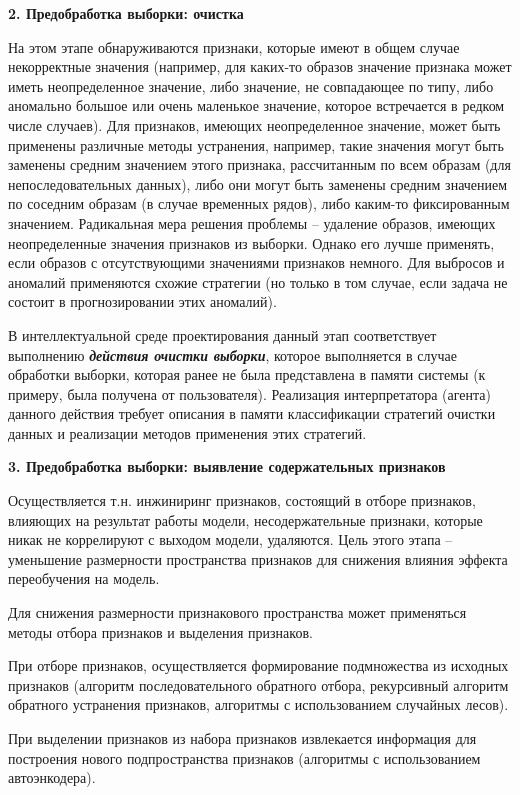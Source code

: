 \textbf{2. Предобработка выборки: очистка}

На этом этапе обнаруживаются признаки, которые имеют в общем случае некорректные значения (например, для каких-то образов значение признака может иметь неопределенное значение, либо значение, не совпадающее по типу, либо аномально большое или очень маленькое значение, которое встречается в редком числе случаев). Для признаков, имеющих неопределенное значение, может быть применены различные методы устранения, например, такие значения могут быть заменены средним значением этого признака, рассчитанным по всем образам (для непоследовательных данных), либо они могут быть заменены средним значением по соседним образам (в случае временных рядов), либо каким-то фиксированным значением. Радикальная мера решения проблемы -- удаление образов, имеющих неопределенные значения признаков из выборки. Однако его лучше применять, если образов с отсутствующими значениями признаков немного. Для выбросов и аномалий применяются схожие стратегии (но только в том случае, если задача не состоит в прогнозировании этих аномалий).

В интеллектуальной среде проектирования данный этап соответствует выполнению \textbf{\textit{действия очистки выборки}}, которое выполняется в случае обработки выборки, которая ранее не была представлена в памяти системы (к примеру, была получена от пользователя).
Реализация интерпретатора (агента) данного действия требует описания в памяти классификации стратегий очистки данных и реализации методов применения этих стратегий.


\textbf{3. Предобработка выборки: выявление содержательных признаков}

Осуществляется т.н. инжиниринг признаков, состоящий в отборе признаков, влияющих на результат работы модели, несодержательные признаки, которые никак не коррелируют с выходом модели, удаляются. Цель этого этапа -- уменьшение размерности пространства признаков для снижения влияния эффекта переобучения на модель.

Для снижения размерности признакового пространства может применяться методы отбора признаков и выделения признаков.

При отборе признаков, осуществляется формирование подмножества из исходных признаков (алгоритм последовательного обратного отбора, рекурсивный алгоритм обратного устранения признаков,  алгоритмы с использованием случайных лесов).

При выделении признаков из набора признаков извлекается информация для построения нового подпространства признаков (алгоритмы с использованием автоэнкодера).


